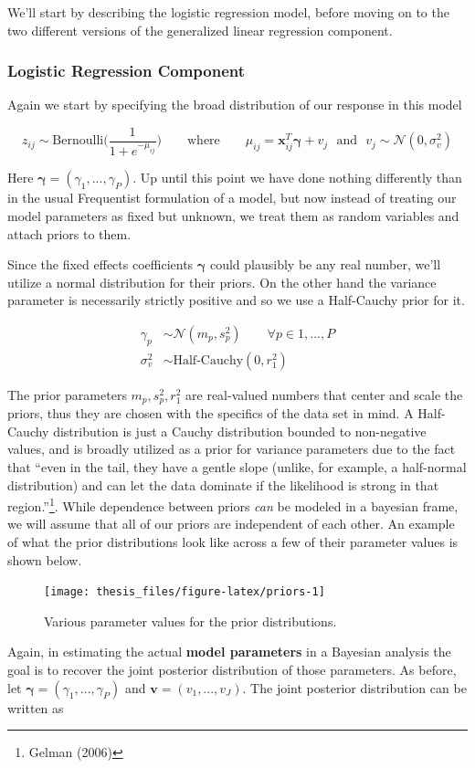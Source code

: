 \documentclass[12pt,twoside]{reedthesis}
\begin{document}
We'll start by describing the logistic regression model, before moving on to the two different versions of the generalized linear regression component.

\hypertarget{bayeslog}{%
\subsubsection{Logistic Regression Component}\label{bayeslog}}

Again we start by specifying the broad distribution of our response in this model

\[
z_{ij} \sim \text{Bernoulli}\Bigg(\frac{1}{1 + e^{-\mu_{ij}}}\Bigg) \qquad \text{where} \qquad \mu_{ij} =\mathbf{x}_{ij}^T\boldsymbol{\gamma} + v_j \ \ \ \text{and} \ \ \ v_j  \sim \mathcal{N}(0, \sigma_{v}^2)
\]

Here \(\boldsymbol{\gamma} = (\gamma_1, ..., \gamma_P)\). Up until this point we have done nothing differently than in the usual Frequentist formulation of a model, but now instead of treating our model parameters as fixed but unknown, we treat them as random variables and attach priors to them.

Since the fixed effects coefficients \(\boldsymbol{\gamma}\) could plausibly be any real number, we'll utilize a normal distribution for their priors. On the other hand the variance parameter is necessarily strictly positive and so we use a Half-Cauchy prior for it.

\[
\begin{aligned}
\gamma_p &\sim \mathcal{N}(m_p, s_p^2)  \qquad \forall p\in 1, ...,P \\
\sigma_{v}^2 &\sim \text{Half-Cauchy}(0, r_1^2)
\end{aligned}
\]

The prior parameters \(m_p, s_p^2, r_1^2\) are real-valued numbers that center and scale the priors, thus they are chosen with the specifics of the data set in mind. A Half-Cauchy distribution is just a Cauchy distribution bounded to non-negative values, and is broadly utilized as a prior for variance parameters due to the fact that ``even in the tail, they have a gentle slope (unlike, for example, a half-normal distribution) and can let the data dominate if the likelihood is strong in that region.''\footnote{Gelman (2006)}. While dependence between priors \emph{can} be modeled in a bayesian frame, we will assume that all of our priors are independent of each other. An example of what the prior distributions look like across a few of their parameter values is shown below.
\begin{figure}

{\centering \texttt{[image: thesis\_files/figure-latex/priors-1]} 

}

\caption{Various parameter values for the prior distributions.}\label{fig:priors}
\end{figure}
Again, in estimating the actual \textbf{model parameters} in a Bayesian analysis the goal is to recover the joint posterior distribution of those parameters. As before, let \(\boldsymbol{\gamma} = (\gamma_1, ...,\gamma_P)\) and \(\mathbf{v} = (v_1, ..., v_J)\). The joint posterior distribution can be written as
\end{document}
